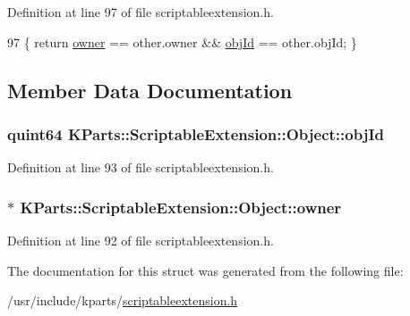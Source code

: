 Definition at line 97 of file scriptableextension.\+h.


\begin{DoxyCode}
97 \{ \textcolor{keywordflow}{return} \hyperlink{structKParts_1_1ScriptableExtension_1_1Object_a2e2ad2aca3cec31e49e8393658a6997c}{owner} == other.owner && \hyperlink{structKParts_1_1ScriptableExtension_1_1Object_a884270fd3423ea40ec2920cb15c9bd15}{objId} == other.objId; \}
\end{DoxyCode}


\subsection{Member Data Documentation}
\hypertarget{structKParts_1_1ScriptableExtension_1_1Object_a884270fd3423ea40ec2920cb15c9bd15}{
\subsubsection[{obj\+Id}]{\setlength{\rightskip}{0pt plus 5cm}quint64 K\+Parts\+::\+Scriptable\+Extension\+::\+Object\+::obj\+Id}}\label{structKParts_1_1ScriptableExtension_1_1Object_a884270fd3423ea40ec2920cb15c9bd15}


Definition at line 93 of file scriptableextension.\+h.

\hypertarget{structKParts_1_1ScriptableExtension_1_1Object_a2e2ad2aca3cec31e49e8393658a6997c}{
\subsubsection[{owner}]{$\ast$ K\+Parts\+::\+Scriptable\+Extension\+::\+Object\+::owner}}\label{structKParts_1_1ScriptableExtension_1_1Object_a2e2ad2aca3cec31e49e8393658a6997c}


Definition at line 92 of file scriptableextension.\+h.



The documentation for this struct was generated from the following file\+:\begin{DoxyCompactItemize}
\item 
/usr/include/kparts/\hyperlink{scriptableextension_8h}{scriptableextension.\+h}\end{DoxyCompactItemize}
